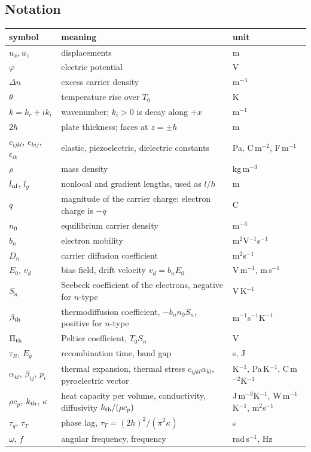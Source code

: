 \documentclass[11pt]{article}
\begin{document}
\subsection{Notation}

\begin{center}
\small
\begin{tabular}{p{2.4cm}p{6.7cm}p{3.4cm}}
\toprule
symbol & meaning & unit\\
\midrule
$u_x,u_z$ & displacements & m\\
$\varphi$ & electric potential & V\\
$\Delta n$ & excess carrier density & m$^{-3}$\\
$\theta$ & temperature rise over $T_0$ & K\\
$k=k_r+ik_i$ & wavenumber; $k_i>0$ is decay along $+x$ & m$^{-1}$\\
$2h$ & plate thickness; faces at $z=\pm h$ & m\\
$c_{ijkl}$, $e_{kij}$, $\epsilon_{ik}$ & elastic, piezoelectric, dielectric constants & Pa, C\,m$^{-2}$, F\,m$^{-1}$\\
$\rho$ & mass density & kg\,m$^{-3}$\\
$l_{\rm nl}$, $l_g$ & nonlocal and gradient lengths, used as $l/h$ & m\\
$q$ & magnitude of the carrier charge; electron charge is $-q$ & C\\
$n_0$ & equilibrium carrier density & m$^{-3}$\\
$b_n$ & electron mobility & m$^2$V$^{-1}$s$^{-1}$\\
$D_n$ & carrier diffusion coefficient & m$^2$s$^{-1}$\\
$E_0$, $v_d$ & bias field, drift velocity $v_d=b_nE_0$ & V\,m$^{-1}$, m\,s$^{-1}$\\
$S_n$ & Seebeck coefficient of the electrons, negative for $n$-type & V\,K$^{-1}$\\
$\beta_{\rm th}$ & thermodiffusion coefficient, $-b_nn_0S_n$, positive for $n$-type & m$^{-1}$s$^{-1}$K$^{-1}$\\
$\Pi_{\rm th}$ & Peltier coefficient, $T_0S_n$ & V\\
$\tau_R$, $E_g$ & recombination time, band gap & s, J\\
$\alpha_{kl}$, $\beta_{ij}$, $p_i$ & thermal expansion, thermal stress $c_{ijkl}\alpha_{kl}$, pyroelectric vector & K$^{-1}$, Pa\,K$^{-1}$, C\,m$^{-2}$K$^{-1}$\\
$\rho c_p$, $k_{\rm th}$, $\kappa$ & heat capacity per volume, conductivity, diffusivity $k_{\rm th}/(\rho c_p)$ & J\,m$^{-3}$K$^{-1}$, W\,m$^{-1}$K$^{-1}$, m$^2$s$^{-1}$\\
$\tau_q$, $\tau_T$ & phase lag, $\tau_T=(2h)^2/(\pi^2\kappa)$ & s\\
$\omega$, $f$ & angular frequency, frequency & rad\,s$^{-1}$, Hz\\
\bottomrule
\end{tabular}
\end{center}
\end{document}
